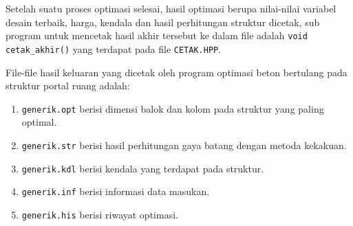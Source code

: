 Setelah suatu proses optimasi selesai, hasil optimasi berupa nilai-nilai
variabel desain terbaik, harga, kendala dan hasil perhitungan struktur
dicetak, sub program untuk mencetak hasil akhir tersebut ke dalam file
adalah \texttt{void cetak\_akhir()} yang terdapat pada file
\texttt{CETAK.HPP}.

File-file hasil keluaran yang dicetak oleh program optimasi beton
bertulang pada struktur portal ruang adalah:
\begin{enumerate}[label=\arabic*.]
\item \texttt{generik.opt} berisi dimensi balok dan kolom pada struktur
      yang paling optimal.
\item \texttt{generik.str} berisi hasil perhitungan gaya batang dengan
      metoda kekakuan.
\item \texttt{generik.kdl} berisi kendala yang terdapat pada struktur.
\item \texttt{generik.inf} berisi informasi data masukan.
\item \texttt{generik.his} berisi riwayat optimasi.
\end{enumerate}
